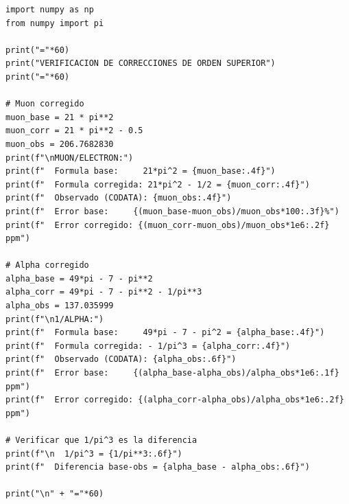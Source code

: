 \begin{lstlisting}[caption={Verificación de Correcciones - Capítulo 11}]
import numpy as np
from numpy import pi

print("="*60)
print("VERIFICACION DE CORRECCIONES DE ORDEN SUPERIOR")
print("="*60)

# Muon corregido
muon_base = 21 * pi**2
muon_corr = 21 * pi**2 - 0.5
muon_obs = 206.7682830
print(f"\nMUON/ELECTRON:")
print(f"  Formula base:     21*pi^2 = {muon_base:.4f}")
print(f"  Formula corregida: 21*pi^2 - 1/2 = {muon_corr:.4f}")
print(f"  Observado (CODATA): {muon_obs:.4f}")
print(f"  Error base:     {(muon_base-muon_obs)/muon_obs*100:.3f}%")
print(f"  Error corregido: {(muon_corr-muon_obs)/muon_obs*1e6:.2f} ppm")

# Alpha corregido
alpha_base = 49*pi - 7 - pi**2
alpha_corr = 49*pi - 7 - pi**2 - 1/pi**3
alpha_obs = 137.035999
print(f"\n1/ALPHA:")
print(f"  Formula base:     49*pi - 7 - pi^2 = {alpha_base:.4f}")
print(f"  Formula corregida: - 1/pi^3 = {alpha_corr:.4f}")
print(f"  Observado (CODATA): {alpha_obs:.6f}")
print(f"  Error base:     {(alpha_base-alpha_obs)/alpha_obs*1e6:.1f} ppm")
print(f"  Error corregido: {(alpha_corr-alpha_obs)/alpha_obs*1e6:.2f} ppm")

# Verificar que 1/pi^3 es la diferencia
print(f"\n  1/pi^3 = {1/pi**3:.6f}")
print(f"  Diferencia base-obs = {alpha_base - alpha_obs:.6f}")

print("\n" + "="*60)
\end{lstlisting}

